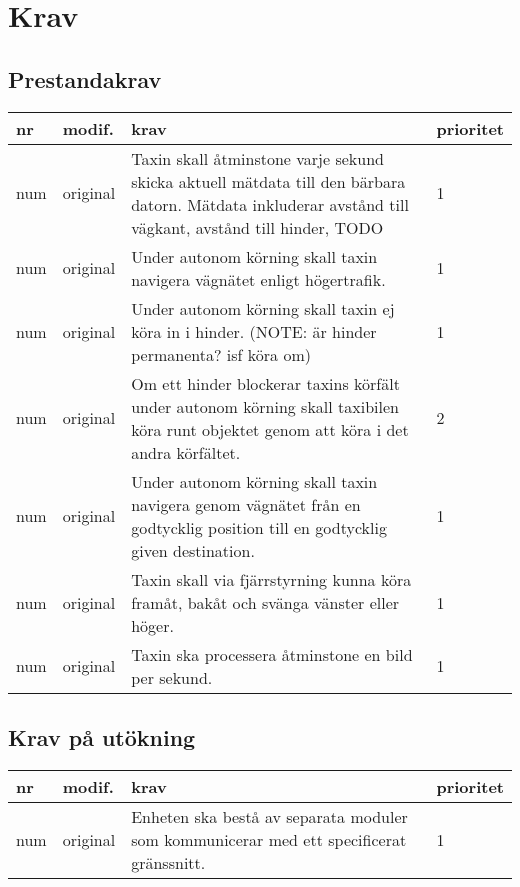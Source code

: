 \documentclass[krav.tex]{subfiles}
\newenvironment{reqlist}
{
    \begin{tabular}{|l|l|l|l|}
    \hline
    \bfseries nr &
    \bfseries modif. &
    \bfseries krav &
    \bfseries prioritet \\
}{
    \hline
    \end{tabular}
}
\newcommand{\req}[3]{
    \hline
    num & #1 & #3 & #2 \\
}
\begin{document}
\section{Krav}
\subsection{Prestandakrav}
\begin{reqlist}
\req{original}{1}{
    Taxin skall åtminstone varje sekund skicka aktuell mätdata till den bärbara
    datorn. Mätdata inkluderar avstånd till vägkant, avstånd till hinder, TODO
}
\req{original}{1}{
    Under autonom körning skall taxin navigera vägnätet enligt högertrafik.
}
\req{original}{1}{
    Under autonom körning skall taxin ej köra in i hinder. (NOTE: är hinder
    permanenta? isf köra om)
}
\req{original}{2}{
    Om ett hinder blockerar taxins körfält under autonom körning skall
    taxibilen köra runt objektet genom att köra i det andra körfältet.
}
\req{original}{1}{
    Under autonom körning skall taxin navigera genom vägnätet från en
    godtycklig position till en godtycklig given destination.
}
\req{original}{1}{
    Taxin skall via fjärrstyrning kunna köra framåt, bakåt och svänga vänster
    eller höger.
}
\req{original}{1}{
    Taxin ska processera åtminstone en bild per sekund.
}
\end{reqlist}

\subsection{Krav på utökning}
\begin{reqlist}
\req{original}{1}{
    Enheten ska bestå av separata moduler som kommunicerar med ett specificerat
    gränssnitt.
}
\end{reqlist}
\end{document}
